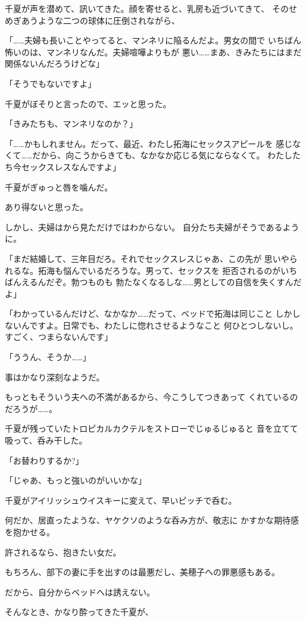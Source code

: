﻿\documentclass[
    book,tate,
    line_length=30zw,
    jafontsize=12pt,
    paper=b5j,
    landscape,
    ]{jlreq}
\begin{document}
千夏が声を潜めて、訊いてきた。顔を寄せると、乳房も近づいてきて、
そのせめぎあうような二つの球体に圧倒されながら、

「……夫婦も長いことやってると、マンネリに陥るんだよ。男女の間で
いちばん怖いのは、マンネリなんだ。夫婦喧嘩よりもが
悪い……まあ、きみたちにはまだ関係ないんだろうけどな」

「そうでもないですよ」

千夏がぼそりと言ったので、エッと思った。

「きみたちも、マンネリなのか？」

「……かもしれません。だって、最近、わたし拓海にセックスアピールを
感じなくて……だから、向こうからきても、なかなか応じる気にならなくて。
わたしたち今セックスレスなんですよ」

千夏がぎゅっと唇を噛んだ。

あり得ないと思った。

しかし、夫婦はから見ただけではわからない。
自分たち夫婦がそうであるように。

「まだ結婚して、三年目だろ。それでセックスレスじゃあ、この先が
思いやられるな。拓海も悩んでいるだろうな。男って、セックスを
拒否されるのがいちばんえるんだぞ。勃つものも
勃たなくなるしな……男としての自信を失くすんだよ」

「わかっているんだけど、なかなか……だって、ベッドで拓海は同じこと
しかしないんですよ。日常でも、わたしに惚れさせるようなこと
何ひとつしないし。すごく、つまらないんです」

「ううん、そうか……」

事はかなり深刻なようだ。

もっともそういう夫への不満があるから、今こうしてつきあって
くれているのだろうが……。

千夏が残っていたトロピカルカクテルをストローでじゅるじゅると
音を立てて吸って、呑み干した。

「お替わりするか?」

「じゃあ、もっと強いのがいいかな」

千夏がアイリッシュウイスキーに変えて、早いピッチで呑む。

何だか、居直ったような、ヤケクソのような呑み方が、敬志に
かすかな期待感を抱かせる。

許されるなら、抱きたい女だ。

もちろん、部下の妻に手を出すのは最悪だし、美穂子への罪悪感もある。

だから、自分からベッドへは誘えない。

そんなとき、かなり酔ってきた千夏が、
\end{document}
